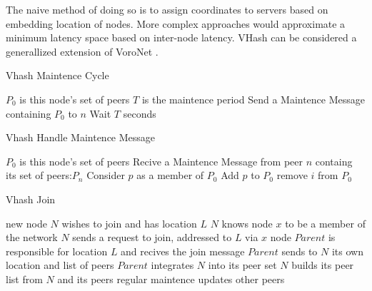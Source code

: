 \documentclass[11pt]{IEEEtran} %
\begin{document}
The naive method of doing so is to assign coordinates to servers based on embedding location of nodes. More complex approaches would approximate a minimum latency space based on inter-node latency. VHash can be considered  a generallized extension of VoroNet \cite{voronet}.



\begin{algorithm}
\caption{Vhash Maintence Cycle}
\label{maintence}
\begin{algorithmic}[1]  %
	\STATE $P_0$ is this node's set of peers
    \STATE $T$ is the maintence period
        	\STATE Send a Maintence Message containing $P_0$ to $n$
        \ENDFOR
    \STATE Wait $T$ seconds
    \ENDWHILE
\end{algorithmic}
\end{algorithm}

\begin{algorithm}
\caption{Vhash Handle Maintence Message}
\label{handelmaintence}
\begin{algorithmic}[1]  %
	\STATE $P_0$ is this node's set of peers
	\STATE Recive a Maintence Message from peer $n$ containg its set of peers:$P_n$
    	\STATE Consider $p$ as a member of $P_0$
        	\STATE Add $p$ to $P_0$
                	\STATE remove $i$ from $P_0$
                \ENDIF
            \ENDFOR
        \ENDIF
    \ENDFOR
\end{algorithmic}
\end{algorithm}

\begin{algorithm}
\caption{Vhash Join}
\label{routing}
\begin{algorithmic}[1]  %
\STATE new node $N$ wishes to join and has location $L$
\STATE $N$ knows node $x$ to be a member of the network
\STATE $N$ sends a request to join, addressed to $L$ via $x$
\STATE node $Parent$ is responsible for location $L$ and recives the join message
\STATE $Parent$ sends to $N$ its own location and list of peers
\STATE $Parent$ integrates $N$ into its peer set
\STATE $N$ builds its peer list from $N$ and its peers
\STATE regular maintence updates other peers
\end{algorithmic}
\end{algorithm}
\end{document}

